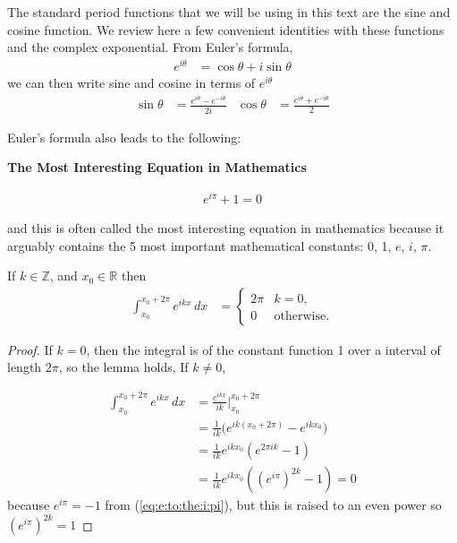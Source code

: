 The standard period functions that we will be using in this text are the sine and cosine function.  We review here a few convenient identities with these functions and the complex exponential.  From Euler's formula,
%
\begin{align*}
e^{i \theta} & = \cos \theta  + i \sin \theta
\end{align*}
we can then write sine and cosine in terms of $e^{i \theta}$
%
\begin{align*}
\sin \theta & = \frac{e^{i \theta}- e^{-i \theta}}{2i} & \cos \theta & = \frac{e^{i \theta} + e^{-i \theta}}{2} 
\end{align*}

Euler's formula also leads to the following:

\begin{Boxed*}
\noindent{}\textbf{The Most Interesting Equation in Mathematics}

\begin{align} 
e^{i\pi} + 1 = 0  \label{eq:e:to:the:i:pi}
\end{align}
\end{Boxed*}
%
and this is often called the most interesting equation in mathematics because it arguably contains the 5 most important mathematical constants: 0, 1, $e$, $i$, $\pi$.  




\begin{lemma} \label{lem:int:complex:exp}
If $k \in \mathbb{Z}$,  and  $x_0 \in \mathbb{R}$  then 
%
\begin{align*}
\int_{x_0}^{x_0 + 2\pi} e^{i kx} \, dx & = \begin{cases}
2\pi & k = 0, \\
0 & \text{otherwise}.
\end{cases}
\end{align*}
\end{lemma}

\begin{proof}

If $k=0$, then the integral is of the constant function 1 over a interval of length $2\pi$, so the lemma holds,  If $k \neq 0$, 

\begin{align*}
\int_{x_0}^{x_0 + 2\pi} e^{i kx} \, dx & = \frac{e^{i k x}}{i k} \biggr \vert_{x_0} ^{x_0 + 2\pi}   \\
& = \frac{1}{ik} \bigl( e^{ik(x_0+2\pi)} - e^{ikx_0} \bigr) \\
& = \frac{1}{ik} e^{ikx_0} (e^{2\pi i k} -1 ) \\
& = \frac{1}{ik} e^{ikx_0} ( (e^{i\pi})^{2k} -1 ) = 0 
\end{align*}
because $e^{i\pi}=-1$ from (\ref{eq:e:to:the:i:pi}),  but this is raised to an even power so $(e^{i\pi})^{2k}=1$ 

\end{proof}

